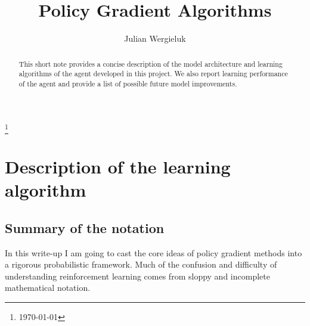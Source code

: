 \documentclass[a4paper,12pt]{amsart}
\title{Policy Gradient Algorithms}
\author{Julian Wergieluk}\address{}\email{julian.wergieluk@risklab.com}
\begin{document}
\maketitle

\begin{abstract}
This short note provides a concise description of the model architecture and
learning algorithms of the agent developed in this project. We also report learning
performance of the agent and provide a list of possible future model improvements.
\end{abstract}
\renewcommand*{\thefootnote}{}\footnote{\today{}}

\section{Description of the learning algorithm}


\subsection{Summary of the notation}

In this write-up I am going to cast the core ideas of policy gradient methods
into a rigorous probabilistic framework. Much of the confusion and
difficulty of understanding reinforcement learning comes from sloppy and
incomplete mathematical notation.
\end{document}
